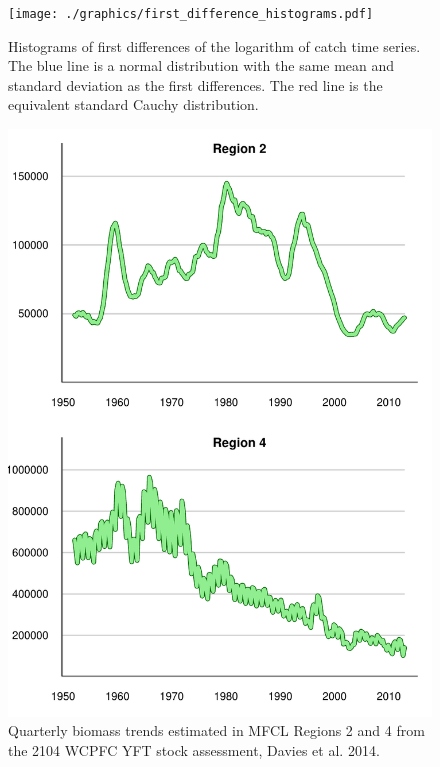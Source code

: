\documentclass[12pt,letterpaper,twoside]{article}
\begin{document}
\begin{figure}
\begin{center}
\texttt{[image: ./graphics/first\_difference\_histograms.pdf]}
\caption{\label{fig:diff1histo}
Histograms of first differences of the logarithm of catch time series. 
The blue line is
a normal distribution with the same mean and standard deviation as the
first differences. The red line is the equivalent standard Cauchy distribution.}
\end{center}
\end{figure}

\begin{figure}
\begin{center}
\includegraphics[width=\textwidth]{./graphics/MFCL_region_biomass.pdf}
\caption{\label{fig:MFCLregionB}
Quarterly biomass trends estimated in MFCL Regions 2 and 4 from the
2104 WCPFC YFT stock assessment, Davies et al. 2014.
}
\end{center}
\end{figure}
\end{document}
